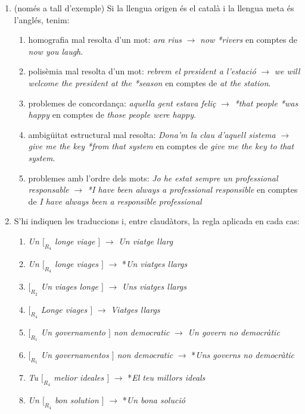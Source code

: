 \begin{enumerate}
\item (només a tall d'exemple) Si la llengua origen és el català i la
  llengua meta és l'anglés, tenim:
  \begin{enumerate}
  \item homografia mal resolta d'un mot: \emph{ara rius} $\to$
    \emph{now *rivers} en comptes de \emph{now you laugh}.
  \item polisèmia mal resolta d'un mot: \emph{rebrem el president a
      l'estació} $\to$ \emph{we will welcome the president at the
      *season} en comptes de \emph{at the station}.
  \item problemes de concordança: \emph{aquella gent estava feliç}
    $\to$ \emph{*that people *was happy} en comptes de \emph{those
      people were happy}.
  \item ambigüitat estructural mal resolta: \emph{Dona'm la clau
      d'aquell sistema} $\to$ \emph{give me the key *from that system}
    en comptes de \emph{give me the key to that system}.
  \item problemes amb l'ordre dels mots: \emph{Jo he estat sempre un
      professional responsable} $\to$ \emph{*I have been always a
      professional responsible} en comptes de \emph{I have always been
      a responsible professional}
  \end{enumerate}

\item S'hi indiquen les traduccions i, entre claudàtors, la regla
  aplicada en cada cas:
  \begin{enumerate}
  \item \emph{Un $[_{R_4}$ longe viage $]$} $\to$ \emph{Un viatge llarg}
  \item \emph{Un $[_{R_4}$ longe viages $]$} $\to$ *\emph{Un viatges
    llargs}
  \item \emph{$[_{R_2}$ Un viages longe $]$} $\to$ \emph{Uns viatges
    llargs}
  \item \emph{$[_{R_4}$ Longe viages $]$} $\to$ \emph{Viatges llargs}
  \item \emph{$[_{R_1}$ Un governamento $]$ non democratic} $\to$ \emph{Un
    govern no democràtic}
  \item \emph{$[_{R_1}$ Un governamentos $]$ non democratic} $\to$
    *\emph{Uns governs no democràtic}
  \item \emph{Tu $[_{R_4}$ melior ideales $]$} $\to$ *\emph{El teu millors
    ideals}
  \item \emph{Un $[_{R_4}$ bon solution $]$} $\to$ *\emph{Un bona solució}
  \end{enumerate}



\end{enumerate}
